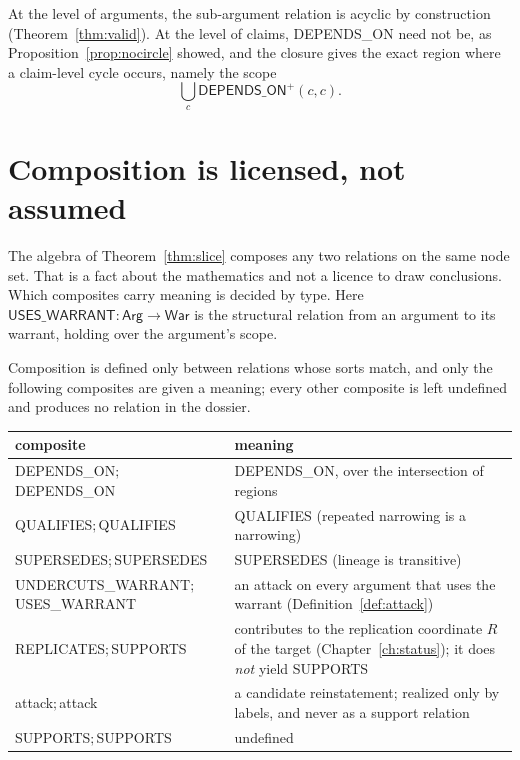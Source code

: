 At the level of arguments, the sub-argument relation is acyclic by construction (Theorem~\ref{thm:valid}). At the level of claims, \textsf{DEPENDS\_ON} need not be, as Proposition~\ref{prop:nocircle} showed, and the closure gives the exact region where a claim-level cycle occurs, namely the scope
\[\bigcup_c\textsf{DEPENDS\_ON}^+(c,c).
\]

\section{Composition is licensed, not assumed}

The algebra of Theorem~\ref{thm:slice} composes any two relations on the same node set. That is a fact about the mathematics and not a licence to draw conclusions. Which composites carry meaning is decided by type. Here $\textsf{USES\_WARRANT}:\mathsf{Arg}\to\mathsf{War}$ is the structural relation from an argument to its warrant, holding over the argument's scope.

\begin{designrule}\label{rule:licensed}
Composition is defined only between relations whose sorts match, and only the following composites are given a meaning; every other composite is left undefined and produces no relation in the dossier.
\begin{center}
\small
\begin{tabularx}{\textwidth}{@{}l X@{}}
\toprule
composite & meaning\\
\midrule
\textsf{DEPENDS\_ON}$;$\textsf{DEPENDS\_ON} & \textsf{DEPENDS\_ON}, over the intersection of regions\\
\textsf{QUALIFIES}$;$\textsf{QUALIFIES} & \textsf{QUALIFIES} (repeated narrowing is a narrowing)\\
\textsf{SUPERSEDES}$;$\textsf{SUPERSEDES} & \textsf{SUPERSEDES} (lineage is transitive)\\
\textsf{UNDERCUTS\_WARRANT}$;$\textsf{USES\_WARRANT} & an attack on every argument that uses the warrant (Definition~\ref{def:attack})\\
\textsf{REPLICATES}$;$\textsf{SUPPORTS} & contributes to the replication coordinate $R$ of the target (Chapter~\ref{ch:status}); it does \emph{not} yield \textsf{SUPPORTS}\\
attack$;$attack & a candidate reinstatement; realized only by labels, and never as a support relation\\
\textsf{SUPPORTS}$;$\textsf{SUPPORTS} & undefined\\
\bottomrule
\end{tabularx}
\end{center}
\end{designrule}


